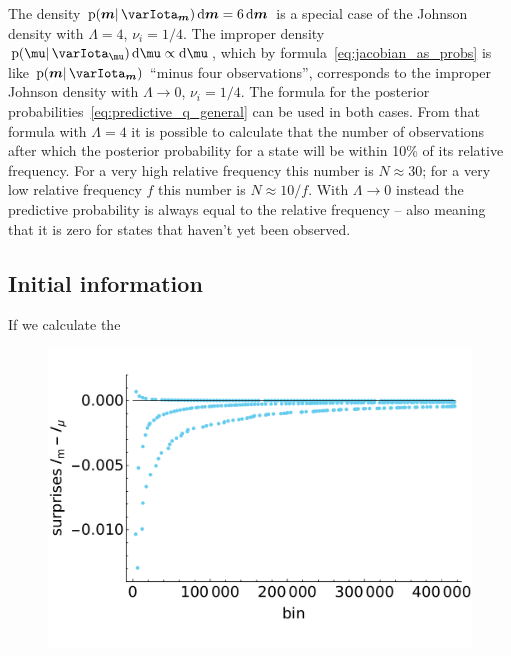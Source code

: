 \documentclass[\ifafour a4paper,12pt,\else a5paper,10pt,\fi%
onecolumn,oneside,article,%
british%
]{memoir}
\theoremstyle{remark}
\theoremstyle{innote}
\newcommand*{\di}{\mathrm{d}}%
\newcommand*{\pf}{\mathrm{p}}%
\renewcommand*{\|}{\mathpunct{|}}
\newcommand*{\yI}{\varIota}
\newcommand*{\yth}{\bm{\mu}}
\newcommand*{\yt}{\bm{m}}
\newcommand*{\yIth}{\yI_{\yth}}
\newcommand*{\yIt}{\yI_{\yt}}
\newcommand*{\yN}{\varLambda}
\newcommand*{\ynn}{\nu}
\begin{document}
\bigskip

The density $\pf(\yt \| \yIt)\,\di\yt = 6\,\di\yt$ is a special case of the
Johnson density with $\yN=4$, $\ynn_i=1/4$. The improper density
$\pf(\yth \| \yIth)\,\di\yth \propto \di\yth$, which by
formula~\eqref{eq:jacobian_as_probs} is like $\pf(\yt \| \yIt)$
\enquote{minus four observations}, corresponds to the improper Johnson
density with $\yN\to 0$, $\ynn_i=1/4$. The formula for the posterior
probabilities~\eqref{eq:predictive_q_general} can be used in both cases.
From that formula with $\yN=4$ it is possible to calculate that the number
of observations after which the posterior probability for a state will be
within 10\% of its relative frequency. For a very high relative frequency
this number is $N\approx 30$; for a very low relative frequency $f$ this
number is $N\approx 10/f$. With $\yN \to 0$ instead the predictive
probability is always equal to the relative frequency -- also meaning that
it is zero for states that haven't yet been observed.


\subsection{Initial information}
\label{sec:initial_info}

If we calculate the




\begin{figure}%
  \centering\includegraphics[width=\linewidth]{diff_surprises.pdf}\\
  \caption{}
  \label{fig:comp_priors}
\end{figure}%
\end{document}
